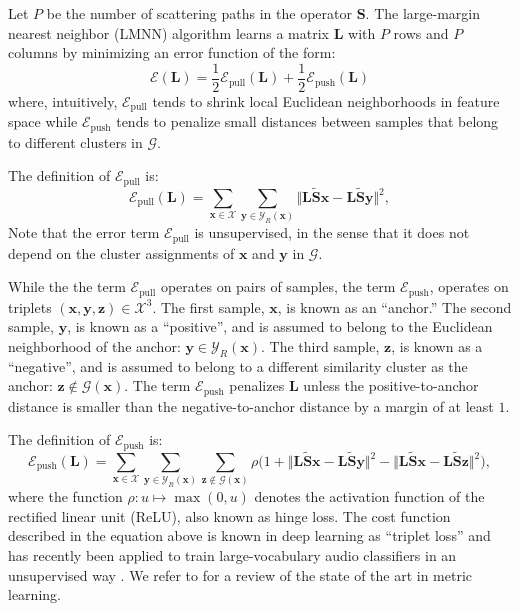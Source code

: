 \documentclass{bmcart}
\begin{document}
Let $P$ be the number of scattering paths in the operator $\mathbf{S}$. The large-margin nearest neighbor (LMNN) algorithm learns a matrix $\mathbf{L}$ with $P$ rows and $P$ columns by minimizing an error function of the form:
\begin{equation}
\mathcal{E}(\mathbf{L}) = \frac{1}{2} \mathcal{E}_{\textrm{pull}} (\mathbf{L}) + \frac{1}{2} \mathcal{E}_{\textrm{push}} (\mathbf{L})
\end{equation}
where, intuitively, $\mathcal{E}_{\textrm{pull}}$ tends to shrink local Euclidean neighborhoods in feature space while $\mathcal{E}_{\textrm{push}}$ tends to penalize small distances between samples that belong to different clusters in $\mathcal{G}$.

The definition of $\mathcal{E}_{\textrm{pull}}$ is:
\begin{equation}
\mathcal{E}_{\textrm{pull}} (\mathbf{L}) =
\sum_{\boldsymbol{x}\in\mathcal{X}}
\sum_{\boldsymbol{y}\in\mathcal{Y}_R (\boldsymbol{x})}
\big\Vert
\mathbf{L}\mathbf{\widetilde{S}}\boldsymbol{x} - \mathbf{L}\mathbf{\widetilde{S}}\boldsymbol{y}
\big\Vert^2,
\end{equation}
Note that the error term $\mathcal{E}_\textrm{pull}$ is unsupervised, in the sense that it does not depend on the cluster assignments of $\boldsymbol{x}$ and $\boldsymbol{y}$ in $\mathcal{G}$.

While the the term $\mathcal{E}_{\textrm{pull}}$ operates on pairs of samples, the term $\mathcal{E}_{\textrm{push}}$, operates on triplets $(\boldsymbol{x}, \boldsymbol{y}, \boldsymbol{z})\in\mathcal{X}^3$.
The first sample, $\boldsymbol{x}$, is known as an ``anchor.''
The second sample, $\boldsymbol{y}$, is known as a ``positive'', and is assumed to belong to the Euclidean neighborhood of the anchor: $\boldsymbol{y} \in \mathcal{Y}_R (\boldsymbol{x})$.
The third sample, $\boldsymbol{z}$, is known as a ``negative'', and is assumed to belong to a different similarity cluster as the anchor: $\boldsymbol{z}\not\in\mathcal{G}(\boldsymbol{x})$.
The term $\mathcal{E}_{\textrm{push}}$ penalizes $\mathbf{L}$ unless the positive-to-anchor distance is smaller than the negative-to-anchor distance by a margin of at least $1$.

The definition of $\mathcal{E}_{\textrm{push}}$ is:
\begin{equation}
\mathcal{E}_{\textrm{push}} (\mathbf{L}) =
\sum_{\boldsymbol{x}\in\mathcal{X}}
\sum_{\boldsymbol{y}\in\mathcal{Y}_R (\boldsymbol{x})}
\sum_{\boldsymbol{z}\not\in\mathcal{G}(\boldsymbol{x})}
\rho
\Big(
1 +
\big\Vert
\mathbf{L}\mathbf{\widetilde{S}}\boldsymbol{x} - \mathbf{L}\mathbf{\widetilde{S}}\boldsymbol{y}
\big\Vert^2
-
\big\Vert
\mathbf{L}\mathbf{\widetilde{S}}\boldsymbol{x} - \mathbf{L}\mathbf{\widetilde{S}}\boldsymbol{z}
\big\Vert^2
\Big),
\end{equation}
where the function $\rho : u \mapsto \max (0, u)$ denotes the activation function of the rectified linear unit (ReLU), also known as hinge loss.
The cost function described in the equation above is known in deep learning as ``triplet loss'' and has recently been applied to train large-vocabulary audio classifiers in an unsupervised way \cite{jansen2018icassp}.
We refer to \cite{bellet2015book} for a review of the state of the art in metric learning.
\end{document}
